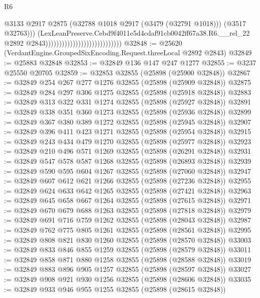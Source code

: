 \begin{lexlean}{R6}
\begin{coremodule}
                                                              @3133
                                                              @2917
                                                              @2875
                                                              (@32788
                                                                @1018
                                                                @2917
                                                                (@3479 (@32791 @1018)))
                                                              (@3517 @32763)))
                                                          (LexLeanPreserve.Cebd9f4011e5d4cdaf91cb0042ff67a38.R6.__rel_22
                                                            @2892
                                                            @2843))))))))))))))))))))))))))))
@32848 := @25620 (VerdantEngine.GroupedSixEncoding.Request.threeLocal @2892 @2843)
@32849 := @25883 @32848
@32853 := @32849 @136 @147 @247 @1277
@32855 := @3237 @25550 @20705
@32859 := @32853 @32855 (@25898 (@25900 @32848))
@32867 := @32849 @254 @267 @277 @1276 @32855 (@25898 (@25909 @32848))
@32875 := @32849 @284 @297 @306 @1275 @32855 (@25898 (@25918 @32848))
@32883 := @32849 @313 @322 @331 @1274 @32855 (@25898 (@25927 @32848))
@32891 := @32849 @338 @351 @360 @1273 @32855 (@25898 (@25936 @32848))
@32899 := @32849 @367 @380 @389 @1272 @32855 (@25898 (@25945 @32848))
@32907 := @32849 @396 @411 @423 @1271 @32855 (@25898 (@25954 @32848))
@32915 := @32849 @243 @434 @479 @1270 @32855 (@25898 (@25977 @32848))
@32923 := @32849 @210 @496 @571 @1269 @32855 (@25898 (@26291 @32848))
@32931 := @32849 @547 @578 @587 @1268 @32855 (@25898 (@26893 @32848))
@32939 := @32849 @590 @595 @604 @1267 @32855 (@25898 (@27060 @32848))
@32947 := @32849 @607 @612 @621 @1266 @32855 (@25898 (@27236 @32848))
@32955 := @32849 @624 @633 @642 @1265 @32855 (@25898 (@27421 @32848))
@32963 := @32849 @645 @658 @667 @1264 @32855 (@25898 (@27615 @32848))
@32971 := @32849 @670 @679 @688 @1263 @32855 (@25898 (@27818 @32848))
@32979 := @32849 @691 @716 @759 @1262 @32855 (@25898 (@28043 @32848))
@32987 := @32849 @762 @775 @805 @1261 @32855 (@25898 (@28561 @32848))
@32995 := @32849 @808 @821 @830 @1260 @32855 (@25898 (@28570 @32848))
@33003 := @32849 @833 @846 @855 @1259 @32855 (@25898 (@28579 @32848))
@33011 := @32849 @858 @871 @880 @1258 @32855 (@25898 (@28588 @32848))
@33019 := @32849 @883 @896 @905 @1257 @32855 (@25898 (@28597 @32848))
@33027 := @32849 @908 @921 @930 @1256 @32855 (@25898 (@28606 @32848))
@33035 := @32849 @933 @946 @955 @1255 @32855 (@25898 (@28615 @32848))

\end{coremodule}
\end{lexlean}
